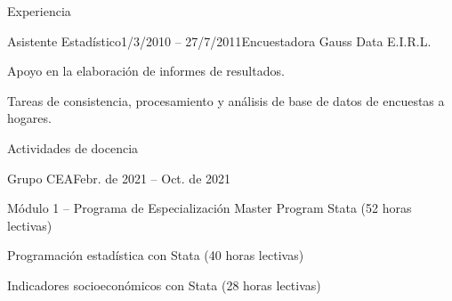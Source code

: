 \documentclass[
	11pt, %
]{resume} %
\begin{document}
\begin{rSection}{Experiencia}

	\begin{rSubsection}{Asistente Estadístico}{1/3/2010 – 27/7/2011}{Encuestadora Gauss Data E.I.R.L.}{}
\item	Apoyo en la elaboración de informes de resultados.
\item	Tareas de consistencia, procesamiento y análisis de base de datos de encuestas a hogares.
	\end{rSubsection}

\end{rSection}



\begin{rSection}{Actividades de docencia}

	\begin{rSubsection}{Grupo CEA}{Febr. de 2021 – Oct. de 2021}{}{}
		\item	Módulo 1 – Programa de Especialización Master Program Stata (52 horas lectivas)
		\item	Programación estadística con Stata (40 horas lectivas)
		\item	Indicadores socioeconómicos con Stata (28 horas lectivas)
	\end{rSubsection}
	
\end{rSection}
\end{document}
